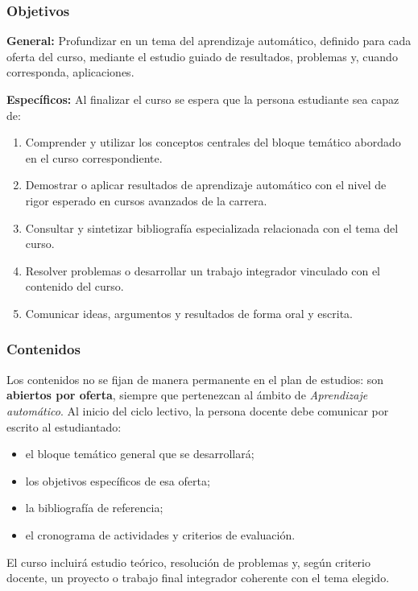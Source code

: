 \begin{refsection}
\subsubsection*{Objetivos}

\textbf{General:} Profundizar en un tema del aprendizaje automático, definido para cada oferta del curso, mediante el estudio guiado de resultados, problemas y, cuando corresponda, aplicaciones.

\textbf{Específicos:} Al finalizar el curso se espera que la persona estudiante sea capaz de:

\begin{enumerate}
\item Comprender y utilizar los conceptos centrales del bloque temático abordado en el curso correspondiente.
\item Demostrar o aplicar resultados de aprendizaje automático con el nivel de rigor esperado en cursos avanzados de la carrera.
\item Consultar y sintetizar bibliografía especializada relacionada con el tema del curso.
\item Resolver problemas o desarrollar un trabajo integrador vinculado con el contenido del curso.
\item Comunicar ideas, argumentos y resultados de forma oral y escrita.
\end{enumerate}

\subsubsection*{Contenidos}

Los contenidos no se fijan de manera permanente en el plan de estudios: son \textbf{abiertos por oferta}, siempre que pertenezcan al ámbito de \emph{Aprendizaje automático}. Al inicio del ciclo lectivo, la persona docente debe comunicar por escrito al estudiantado:

\begin{itemize}
\item el bloque temático general que se desarrollará;
\item los objetivos específicos de esa oferta;
\item la bibliografía de referencia;
\item el cronograma de actividades y criterios de evaluación.
\end{itemize}

El curso incluirá estudio teórico, resolución de problemas y, según criterio docente, un proyecto o trabajo final integrador coherente con el tema elegido.


\end{refsection}
